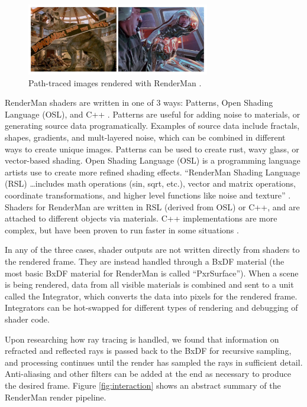 \documentclass[conference]{IEEEtran}
\begin{document}
\begin{figure}[htbp]
\centerline{\includegraphics[width=8cm]{renderman.png}}
\caption{Path-traced images rendered with RenderMan \cite{renderman_pathtrace}.}
\label{fig:renderman}
\end{figure}

RenderMan shaders are written in one of 3 ways:
Patterns, Open Shading Language (OSL), and C++ \cite{renderman}.
Patterns are useful for adding noise to materials, or generating source data
programatically. Examples of source data include
fractals, shapes, gradients, and mult-layered noise,
which can be combined in different ways to create unique images.
Patterns can be used to create rust, wavy glass, or vector-based shading.
Open Shading Language (OSL) is a programming language artists use to create more refined shading effects.
``RenderMan Shading Language (RSL) \dots includes math operations (sin, sqrt, etc.),
vector and matrix operations, coordinate transformations, and higher level functions like noise and texture''
\cite{renderman_docs}.
Shaders for RenderMan are written in RSL (derived from OSL) or C++,
and are attached to different objects via materials.
C++ implementations are more complex, but have been proven to run faster in some situations \cite{renderman}.

In any of the three cases, shader outputs are not written directly
from shaders to the rendered frame. They are instead handled through a BxDF material
(the most basic BxDF material for RenderMan is called ``PxrSurface'').
When a scene is being rendered,
data from all visible materials is combined and sent to a unit called the Integrator,
which converts the data into pixels for the rendered frame.
Integrators can be hot-swapped for different types of rendering and debugging of
shader code.

Upon researching how ray tracing is handled, we found that information
on refracted and reflected rays is passed
back to the BxDF for recursive sampling, and processing continues until the render has sampled
the rays in sufficient detail.
Anti-aliasing and other filters can be added at the end as necessary
to produce the desired frame.
Figure \ref{fig:interaction} shows an abstract summary of the RenderMan render pipeline.
\end{document}
